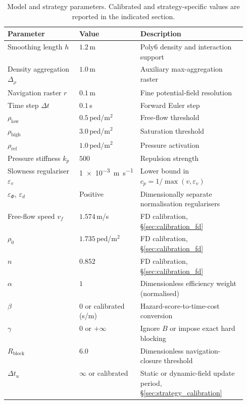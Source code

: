 \documentclass[preprint,12pt]{elsarticle}
\begin{document}
\begin{table}[htbp]
\centering
\caption{Model and strategy parameters. Calibrated and
strategy-specific values are reported in the indicated section.}
\label{tab:params_summary}
\small
\begin{tabularx}{\linewidth}{@{}>{\raggedright\arraybackslash}p{0.30\linewidth}
>{\centering\arraybackslash}p{0.25\linewidth}
>{\raggedright\arraybackslash}X@{}}
\toprule
\textbf{Parameter} & \textbf{Value} & \textbf{Description} \\
\midrule
Smoothing length $h$            & $1.2$\,m   & Poly6 density and interaction support \\
Density aggregation $\Delta_\rho$ & $1.0$\,m & Auxiliary max-aggregation raster \\
Navigation raster $r$           & $0.1$\,m   & Fine potential-field resolution \\
Time step $\Delta t$            & $0.1$\,s   & Forward Euler step \\
$\rho_{\mathrm{low}}$           & $0.5$\,ped/m$^2$ & Free-flow threshold \\
$\rho_{\mathrm{high}}$          & $3.0$\,ped/m$^2$ & Saturation threshold \\
$\rho_{\mathrm{ref}}$           & $1.0$\,ped/m$^2$ & Pressure activation \\
Pressure stiffness $k_p$        & $500$      & Repulsion strength \\
Slowness regulariser $\varepsilon_v$ & \SI{1e-3}{\meter\per\second} & Lower bound in $c_p=1/\max(v,\varepsilon_v)$ \\
$\varepsilon_\Phi$, $\varepsilon_d$ & Positive & Dimensionally separate normalisation regularisers \\
Free-flow speed $v_f$           & $1.574$\,m/s    & FD calibration, \S\ref{sec:calibration_fd} \\
$\rho_0$                        & $1.735$\,ped/m$^2$ & FD calibration, \S\ref{sec:calibration_fd} \\
$n$                             & $0.852$    & FD calibration, \S\ref{sec:calibration_fd} \\
$\alpha$                        & $1$        & Dimensionless efficiency weight (normalised) \\
$\beta$                         & $0$ or calibrated (s/m) & Hazard-score-to-time-cost conversion \\
$\gamma$                        & $0$ or $+\infty$ & Ignore $B$ or impose exact hard blocking \\
$R_{\mathrm{block}}$           & $6.0$      & Dimensionless navigation-closure threshold \\
$\Delta t_u$                    & $\infty$ or calibrated & Static or dynamic-field update period, \S\ref{sec:strategy_calibration} \\
\bottomrule
\end{tabularx}
\end{table}
\end{document}
